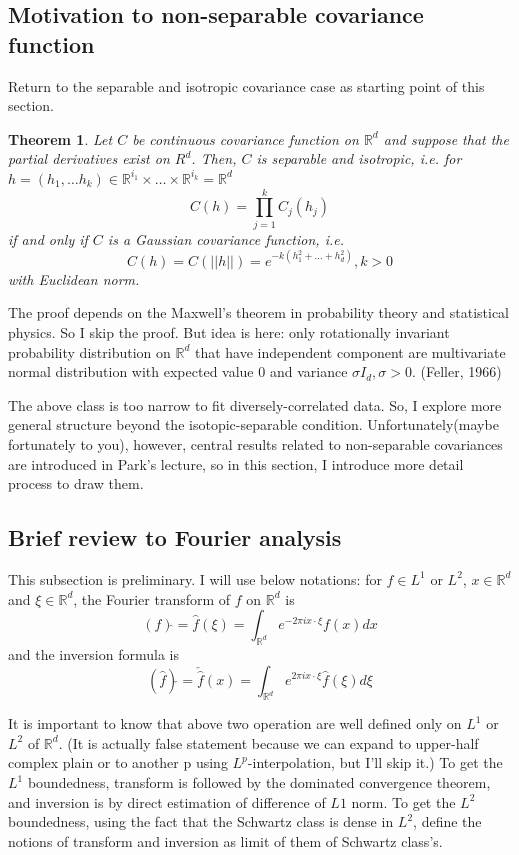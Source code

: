 \documentclass{article}
\newtheorem*{theorem}{Theorem}
\begin{document}
\subsection{Motivation to non-separable covariance function}
Return to the separable and isotropic covariance case as starting point of this section.
\begin{theorem}
    Let $C$ be continuous covariance function on $\mathbb R^d$ and suppose that the partial derivatives exist on $R^d$.
    Then, $C$ is separable and isotropic, i.e. for $h=(h_1,\dots h_k) \in \mathbb R^{i_1} \times \dots \times \mathbb R^{i_k}=\mathbb R^d$
    \[C(h)=\prod_{j=1}^{k}C_j(h_j)\]
    if and only if $C$ is a Gaussian covariance function, i.e.
    \[C(h)=C(||h||)=e^{-k(h_1^2+\dots+h_d^2)}, k>0\]
    with Euclidean norm.
\end{theorem}
The proof depends on the Maxwell's theorem in probability theory and statistical physics. So I skip the proof.
But idea is here: only rotationally invariant probability distribution on $\mathbb R^d$ that have independent component are multivariate normal distribution with expected value $0$ and variance $\sigma I_d, \sigma>0$.
(Feller, 1966)

The above class is too narrow to fit diversely-correlated data. So, I explore more general structure beyond the isotopic-separable condition.
Unfortunately(maybe fortunately to you), however, central results related to non-separable covariances are introduced in Park's lecture,
so in this section, I introduce more detail process to draw them.


\subsection{Brief review to Fourier analysis}
This subsection is preliminary.
I will use below notations: 
for $f\in L^1$ or $L^2$, $x\in\mathbb R^d$ and $\xi\in\mathbb R^d$, the Fourier transform of $f$ on $\mathbb R^d$ is
\[(f)\hat{ } = \hat{f}(\xi)=\int_{\mathbb R^d}e^{-2\pi i x\cdot \xi}f(x)dx\]
and the inversion formula is
\[(\hat{f})\check{ } = \check{\hat{f}}(x)= \int_{\mathbb R^d} e^{2\pi i x\cdot \xi} \hat{f}(\xi) d\xi\]

It is important to know that above two operation are well defined only on $L^1$ or $L^2$ of $\mathbb R^d$. 
(It is actually false statement because we can expand to upper-half complex plain or to another p using $L^p$-interpolation, but I'll skip it.)
To get the $L^1$ boundedness, transform is followed by the dominated convergence theorem,
and inversion is by direct estimation of difference of $L1$ norm.
To get the $L^2$ boundedness, using the fact that the Schwartz class is dense in $L^2$,
define the notions of transform and inversion as limit of them of Schwartz class's.
\end{document}
